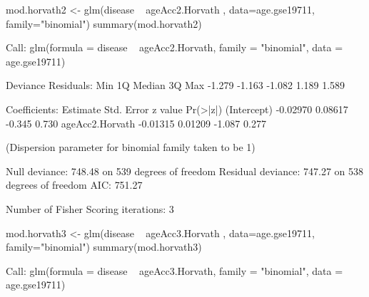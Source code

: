 \documentclass[]{article}
\newcommand{\hlnum}[1]{\textcolor[rgb]{0.816,0.125,0.439}{#1}}%
\newcommand{\hlstr}[1]{\textcolor[rgb]{0.251,0.627,0.251}{#1}}%
\newcommand{\hlopt}[1]{\textcolor[rgb]{0,0,0}{#1}}%
\newcommand{\hlstd}[1]{\textcolor[rgb]{0.251,0.251,0.251}{#1}}%
\newcommand{\hlkwc}[1]{\textcolor[rgb]{0.251,0.251,0.251}{#1}}%
\newcommand{\hlkwd}[1]{\textcolor[rgb]{0.878,0.439,0.125}{#1}}%
\newenvironment{Shaded}{\begin{myshaded}}{\end{myshaded}}
\newcommand{\KeywordTok}[1]{\hlkwd{#1}}
\newcommand{\DataTypeTok}[1]{\hlkwc{#1}}
\newcommand{\DecValTok}[1]{\hlnum{#1}}
\newcommand{\FloatTok}[1]{\hlnum{#1}}
\newcommand{\StringTok}[1]{\hlstr{#1}}
\newcommand{\ControlFlowTok}[1]{\hlkwd{#1}}
\newcommand{\OperatorTok}[1]{\hlopt{#1}}
\newcommand{\ErrorTok}[1]{\textcolor{errorcolor}{#1}}
\newcommand{\NormalTok}[1]{\hlstd{#1}}
\begin{document}
\begin{Shaded}
\begin{Highlighting}[]
\NormalTok{mod.horvath2 <-}\StringTok{ }\KeywordTok{glm}\NormalTok{(disease }\OperatorTok{~}\StringTok{ }\NormalTok{ageAcc2.Horvath , }
                   \DataTypeTok{data=}\NormalTok{age.gse19711,}
                   \DataTypeTok{family=}\StringTok{"binomial"}\NormalTok{)}
\KeywordTok{summary}\NormalTok{(mod.horvath2)}
  
\NormalTok{  Call}\OperatorTok{:}
\StringTok{  }\KeywordTok{glm}\NormalTok{(}\DataTypeTok{formula =}\NormalTok{ disease }\OperatorTok{~}\StringTok{ }\NormalTok{ageAcc2.Horvath, }\DataTypeTok{family =} \StringTok{"binomial"}\NormalTok{, }
      \DataTypeTok{data =}\NormalTok{ age.gse19711)}
  
\NormalTok{  Deviance Residuals}\OperatorTok{:}\StringTok{ }
\StringTok{     }\NormalTok{Min      1Q  Median      3Q     Max  }
  \FloatTok{-1.279}  \FloatTok{-1.163}  \FloatTok{-1.082}   \FloatTok{1.189}   \FloatTok{1.589}  
  
\NormalTok{  Coefficients}\OperatorTok{:}
\StringTok{                  }\NormalTok{Estimate Std. Error z value }\KeywordTok{Pr}\NormalTok{(}\OperatorTok{>}\ErrorTok{|}\NormalTok{z}\OperatorTok{|}\NormalTok{)}
\NormalTok{  (Intercept)     }\FloatTok{-0.02970}    \FloatTok{0.08617}  \FloatTok{-0.345}    \FloatTok{0.730}
\NormalTok{  ageAcc2.Horvath }\FloatTok{-0.01315}    \FloatTok{0.01209}  \FloatTok{-1.087}    \FloatTok{0.277}
  
\NormalTok{  (Dispersion parameter }\ControlFlowTok{for}\NormalTok{ binomial family taken to be }\DecValTok{1}\NormalTok{)}
  
\NormalTok{      Null deviance}\OperatorTok{:}\StringTok{ }\FloatTok{748.48}\NormalTok{  on }\DecValTok{539}\NormalTok{  degrees of freedom}
\NormalTok{  Residual deviance}\OperatorTok{:}\StringTok{ }\FloatTok{747.27}\NormalTok{  on }\DecValTok{538}\NormalTok{  degrees of freedom}
\NormalTok{  AIC}\OperatorTok{:}\StringTok{ }\FloatTok{751.27}
  
\NormalTok{  Number of Fisher Scoring iterations}\OperatorTok{:}\StringTok{ }\DecValTok{3}

\NormalTok{mod.horvath3 <-}\StringTok{ }\KeywordTok{glm}\NormalTok{(disease }\OperatorTok{~}\StringTok{ }\NormalTok{ageAcc3.Horvath , }
                   \DataTypeTok{data=}\NormalTok{age.gse19711,}
                   \DataTypeTok{family=}\StringTok{"binomial"}\NormalTok{)}
\KeywordTok{summary}\NormalTok{(mod.horvath3)}
  
\NormalTok{  Call}\OperatorTok{:}
\StringTok{  }\KeywordTok{glm}\NormalTok{(}\DataTypeTok{formula =}\NormalTok{ disease }\OperatorTok{~}\StringTok{ }\NormalTok{ageAcc3.Horvath, }\DataTypeTok{family =} \StringTok{"binomial"}\NormalTok{, }
      \DataTypeTok{data =}\NormalTok{ age.gse19711)}
  

\end{Highlighting}
\end{Shaded}
\end{document}
